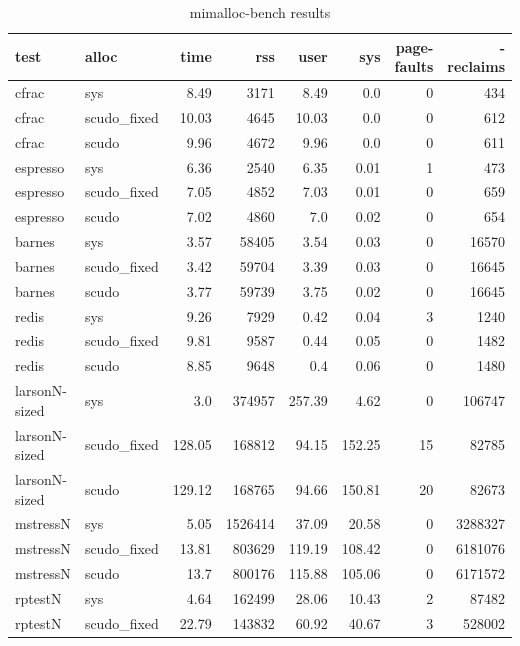 \documentclass[a4paper,11pt,oneside]{report}
\begin{document}
\begin{longtable}[h]{l l r r r r r r}
  \caption{mimalloc-bench results}\label{tab:MimallocBench} \\

  \toprule
  test & alloc & time & rss & user & sys & page-faults & -reclaims \\
  \midrule
  \endhead{}
  cfrac & sys & 8.49 & 3171 & 8.49 & 0.0 & 0 & 434 \\
  \midrule
  cfrac & scudo\_fixed & 10.03 & 4645 & 10.03 & 0.0 & 0 & 612 \\
  \midrule
  cfrac & scudo & 9.96 & 4672 & 9.96 & 0.0 & 0 & 611 \\
  \midrule
  espresso & sys & 6.36 & 2540 & 6.35 & 0.01 & 1 & 473 \\
  \midrule
  espresso & scudo\_fixed & 7.05 & 4852 & 7.03 & 0.01 & 0 & 659 \\
  \midrule
  espresso & scudo & 7.02 & 4860 & 7.0 & 0.02 & 0 & 654 \\
  \midrule
  barnes & sys & 3.57 & 58405 & 3.54 & 0.03 & 0 & 16570 \\
  \midrule
  barnes & scudo\_fixed & 3.42 & 59704 & 3.39 & 0.03 & 0 & 16645 \\
  \midrule
  barnes & scudo & 3.77 & 59739 & 3.75 & 0.02 & 0 & 16645 \\
  \midrule
  redis & sys & 9.26 & 7929 & 0.42 & 0.04 & 3 & 1240 \\
  \midrule
  redis & scudo\_fixed & 9.81 & 9587 & 0.44 & 0.05 & 0 & 1482 \\
  \midrule
  redis & scudo & 8.85 & 9648 & 0.4 & 0.06 & 0 & 1480 \\
  \midrule
  larsonN-sized & sys & 3.0 & 374957 & 257.39 & 4.62 & 0 & 106747 \\
  \midrule
  larsonN-sized & scudo\_fixed & 128.05 & 168812 & 94.15 & 152.25 & 15 & 82785 \\
  \midrule
  larsonN-sized & scudo & 129.12 & 168765 & 94.66 & 150.81 & 20 & 82673 \\
  \midrule
  mstressN & sys & 5.05 & 1526414 & 37.09 & 20.58 & 0 & 3288327 \\
  \midrule
  mstressN & scudo\_fixed & 13.81 & 803629 & 119.19 & 108.42 & 0 & 6181076 \\
  \midrule
  mstressN & scudo & 13.7 & 800176 & 115.88 & 105.06 & 0 & 6171572 \\
  \midrule
  rptestN & sys & 4.64 & 162499 & 28.06 & 10.43 & 2 & 87482 \\
  \midrule
  rptestN & scudo\_fixed & 22.79 & 143832 & 60.92 & 40.67 & 3 & 528002 \\

\end{longtable}
\end{document}
